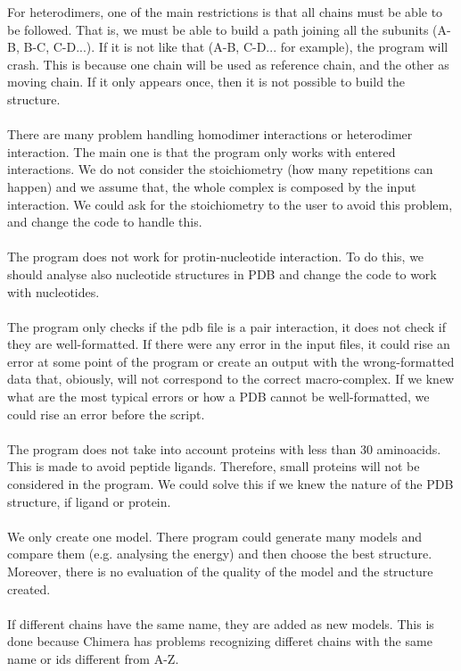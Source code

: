 \documentclass[a4paper,10pt]{report}
\begin{document}
For heterodimers, one of the main restrictions is that all chains must be able to be followed. That is, we must be able to build a path joining all the subunits (A-B, B-C, C-D...). If it is not like that (A-B, C-D... for example), the program will crash. This is because one chain will be used as reference chain, and the other as moving chain. If it only appears once, then it is not possible to build the structure.\\\\
There are many problem handling homodimer interactions or heterodimer interaction. The main one is that the program only works with entered interactions. We do not consider the stoichiometry (how many repetitions can happen) and we assume that, the whole complex is composed by the input interaction. We could ask for the stoichiometry to the user to avoid this problem, and change the code to handle this.\\\\
The program does not work for protin-nucleotide interaction. To do this, we should analyse also nucleotide structures in PDB and change the code to work with nucleotides.\\\\
The program only checks if the pdb file is a pair interaction, it does not check if they are well-formatted. If there were any error in the input files, it could rise an error at some point of the program or create an output with the wrong-formatted data that, obiously, will not correspond to the correct macro-complex. If we knew what are the most typical errors or how a PDB cannot be well-formatted, we could rise an error before the script.\\\\
The program does not take into account proteins with less than 30 aminoacids. This is made to avoid peptide ligands. Therefore, small proteins will not be considered in the program. We could solve this if we knew the nature of the PDB structure, if ligand or protein.\\\\
We only create one model. There program could generate many models and compare them (e.g. analysing the energy) and then choose the best structure. Moreover, there is no evaluation of the quality of the model and the structure created.\\\\
If different chains have the same name, they are added as new models. This is done because Chimera has problems recognizing differet chains with the same name or ids different from A-Z.\\\\
\end{document}
